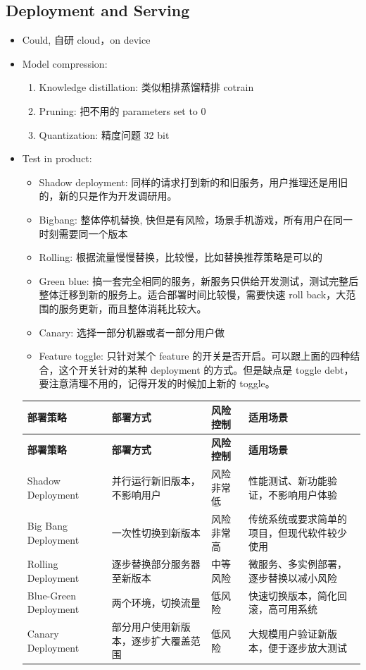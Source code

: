 \documentclass[12pt]{article}
\numberwithin{theorem}{section} %
\numberwithin{definition}{section} %
\numberwithin{assumption}{section} %
\numberwithin{lemma}{section} %
\numberwithin{remark}{section} %
\numberwithin{prop}{section} %
\numberwithin{corollary}{section} %
\numberwithin{example}{section} %
\numberwithin{question}{section} %
\numberwithin{problem}{section} %
\numberwithin{conjecture}{section} %
\numberwithin{append}{section} %
\numberwithin{property}{section} %
\begin{document}
\begin{CJK}{UTF8}{gbsn}
	\subsection{Deployment and Serving}
	\begin{itemize}
		\item Could, 自研 cloud，on device
		\item Model compression:
		\begin{enumerate}
			\item Knowledge distillation: 类似粗排蒸馏精排 cotrain
			\item Pruning: 把不用的 parameters set to 0
			\item Quantization: 精度问题 32 bit
		\end{enumerate}
			\item Test in product: 
			\begin{itemize}
				\item Shadow deployment: 同样的请求打到新的和旧服务，用户推理还是用旧的，新的只是作为开发调研用。
				\item Bigbang: 整体停机替换, 快但是有风险，场景手机游戏，所有用户在同一时刻需要同一个版本
				\item Rolling: 根据流量慢慢替换，比较慢，比如替换推荐策略是可以的
				\item  Green blue: 搞一套完全相同的服务，新服务只供给开发测试，测试完整后整体迁移到新的服务上。适合部署时间比较慢，需要快速 roll back，大范围的服务更新，而且整体消耗比较大。 
				\item Canary: 选择一部分机器或者一部分用户做
				\item Feature toggle: 只针对某个 feature 的开关是否开启。可以跟上面的四种结合，这个开关针对的某种 deployment 的方式。但是缺点是 toggle debt，要注意清理不用的，记得开发的时候加上新的 toggle。
			\end{itemize}
		
	
	\begin{longtable}{p{4cm} p{5cm} p{4cm} p{4cm}}
		\toprule
		\textbf{部署策略} & \textbf{部署方式} & \textbf{风险控制} & \textbf{适用场景} \\
		\endfirsthead
		\toprule
		\textbf{部署策略} & \textbf{部署方式} & \textbf{风险控制} & \textbf{适用场景} \\
		\endhead
		\endfoot
		\bottomrule
		\endlastfoot
		Shadow Deployment & 并行运行新旧版本，不影响用户 & 风险非常低 & 性能测试、新功能验证，不影响用户体验 \\
		Big Bang Deployment & 一次性切换到新版本 & 风险非常高 & 传统系统或要求简单的项目，但现代软件较少使用 \\
		Rolling Deployment & 逐步替换部分服务器至新版本 & 中等风险 & 微服务、多实例部署，逐步替换以减小风险 \\
		Blue-Green Deployment & 两个环境，切换流量 & 低风险 & 快速切换版本，简化回滚，高可用系统 \\
		Canary Deployment & 部分用户使用新版本，逐步扩大覆盖范围 & 低风险 & 大规模用户验证新版本，便于逐步放大测试 \\
	\end{longtable}
	


\end{itemize}
\end{CJK}
\end{document}
